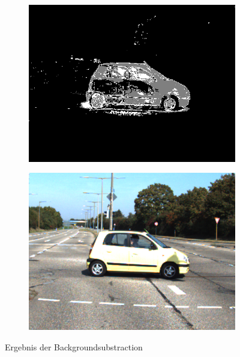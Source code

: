 \documentclass[conference]{IEEEtran}
\begin{document}
\begin{figure}
	\centering
	\begin{subfigure}[t]{0.23\textwidth}
		\includegraphics[width=\textwidth]{trainds01_foregroundmask}
		\label{fig:sub1}
	\end{subfigure}	
	\begin{subfigure}[t]{0.23\textwidth}
		\includegraphics[width=\textwidth]{trainds01_original}
		\label{fig:sub2}
	\end{subfigure}
	\caption{Ergebnis der Backgroundsubstraction}
	\label{fig:test}
\end{figure}
\end{document}
